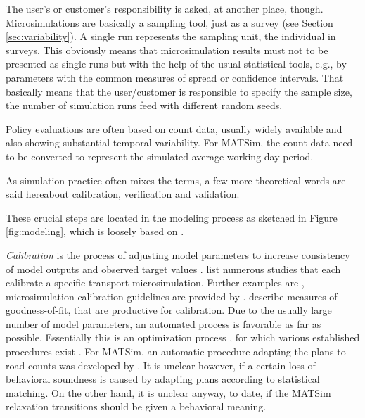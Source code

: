 The user's or customer's responsibility is asked, at another place, though. Microsimulations are basically a sampling tool, just as a survey (see Section \ref{sec:variability}). A single run represents the sampling unit, the individual in surveys. This obviously means that microsimulation results must not to be presented as single runs but with the help of the usual statistical tools, e.g., by parameters with the common measures of spread or confidence intervals. That basically means that the user/customer is responsible to specify the sample size, the number of simulation runs feed with different random seeds. 

Policy evaluations are often based on count data, usually widely available and also showing substantial temporal variability. For MATSim, the count data need to be converted to represent the simulated average working day period.

As simulation practice often mixes the terms, a few more theoretical words are said hereabout calibration, verification and validation. 

These crucial steps are located in the modeling process as sketched in Figure \ref{fig:modeling}, which is loosely based on \citet[][Figure 10.2]{Petty_SokolowskiBanks_2010}. 

\emph{Calibration} is the process of adjusting model parameters to increase consistency of model outputs and observed target values \citep[][p.348]{HollanderLiu_Transportation_2007} \citep[see also][]{TrucanoEtAl_RESS_2006}. \citet[][Table 1]{HollanderLiu_Transportation_2007} list numerous studies that each calibrate a specific transport microsimulation. Further examples are \citet[][]{SmithEtAl_JTE_2008, KimEtAl_TRR_2005, RutterEtAl_JASA_2009}, microsimulation calibration guidelines are provided by \citet[][]{MilamChao_TRBATPM_2001, WegmannEverett_TechRep_CTRUT_2008, DowlingEtAl_manual_2002}. \citet[][Table 2]{HollanderLiu_Transportation_2007} describe measures of goodness-of-fit, that are productive for calibration. Due to the usually large number of model parameters, an automated process is favorable as far as possible. Essentially this is an optimization process \citep[][p.353]{HollanderLiu_Transportation_2007}, for which various established procedures exist \citep[e.g.,][p.41ff]{ZhangMa_ResRep_PATH_2008}. For MATSim, an automatic procedure adapting the plans to road counts was developed by \citet[][]{FloetteroedEtAl_TechRep_TRANSPOR_2008}. It is unclear however, if a certain loss of behavioral soundness is caused by adapting plans according to statistical matching. On the other hand, it is unclear anyway, to date, if the MATSim relaxation transitions should be given a behavioral meaning.

